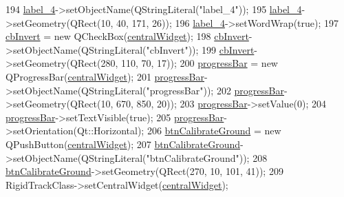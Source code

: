 \begin{DoxyCode}
194         \hyperlink{class_ui___rigid_track_class_aa8e51b4d3909b5d36d9d64961d2648a3}{label\_4}->setObjectName(QStringLiteral(\textcolor{stringliteral}{"label\_4"}));
195         \hyperlink{class_ui___rigid_track_class_aa8e51b4d3909b5d36d9d64961d2648a3}{label\_4}->setGeometry(QRect(10, 40, 171, 26));
196         \hyperlink{class_ui___rigid_track_class_aa8e51b4d3909b5d36d9d64961d2648a3}{label\_4}->setWordWrap(\textcolor{keyword}{true});
197         \hyperlink{class_ui___rigid_track_class_a370014fb6d177a07220b69155b4c101b}{cbInvert} = \textcolor{keyword}{new} QCheckBox(\hyperlink{class_ui___rigid_track_class_ad0855ddf1efd8f0c8821dd2142f6221d}{centralWidget});
198         \hyperlink{class_ui___rigid_track_class_a370014fb6d177a07220b69155b4c101b}{cbInvert}->setObjectName(QStringLiteral(\textcolor{stringliteral}{"cbInvert"}));
199         \hyperlink{class_ui___rigid_track_class_a370014fb6d177a07220b69155b4c101b}{cbInvert}->setGeometry(QRect(280, 110, 70, 17));
200         \hyperlink{class_ui___rigid_track_class_a4f53c207d82dc9555709f1ace400d89b}{progressBar} = \textcolor{keyword}{new} QProgressBar(\hyperlink{class_ui___rigid_track_class_ad0855ddf1efd8f0c8821dd2142f6221d}{centralWidget});
201         \hyperlink{class_ui___rigid_track_class_a4f53c207d82dc9555709f1ace400d89b}{progressBar}->setObjectName(QStringLiteral(\textcolor{stringliteral}{"progressBar"}));
202         \hyperlink{class_ui___rigid_track_class_a4f53c207d82dc9555709f1ace400d89b}{progressBar}->setGeometry(QRect(10, 670, 850, 20));
203         \hyperlink{class_ui___rigid_track_class_a4f53c207d82dc9555709f1ace400d89b}{progressBar}->setValue(0);
204         \hyperlink{class_ui___rigid_track_class_a4f53c207d82dc9555709f1ace400d89b}{progressBar}->setTextVisible(\textcolor{keyword}{true});
205         \hyperlink{class_ui___rigid_track_class_a4f53c207d82dc9555709f1ace400d89b}{progressBar}->setOrientation(Qt::Horizontal);
206         \hyperlink{class_ui___rigid_track_class_a7497d27bfd5a03243079fdb055291264}{btnCalibrateGround} = \textcolor{keyword}{new} QPushButton(\hyperlink{class_ui___rigid_track_class_ad0855ddf1efd8f0c8821dd2142f6221d}{centralWidget});
207         \hyperlink{class_ui___rigid_track_class_a7497d27bfd5a03243079fdb055291264}{btnCalibrateGround}->setObjectName(QStringLiteral(\textcolor{stringliteral}{"btnCalibrateGround"}));
208         \hyperlink{class_ui___rigid_track_class_a7497d27bfd5a03243079fdb055291264}{btnCalibrateGround}->setGeometry(QRect(270, 10, 101, 41));
209         RigidTrackClass->setCentralWidget(\hyperlink{class_ui___rigid_track_class_ad0855ddf1efd8f0c8821dd2142f6221d}{centralWidget});

\end{DoxyCode}
